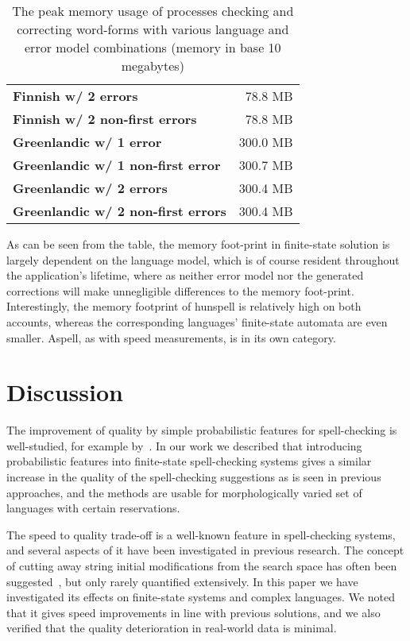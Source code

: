 \documentclass[a4paper,12pt]{article}
\begin{document}
\begin{table}
\begin{tabular}{|l|r|}
        \bf Finnish w/ 2 errors   &  78.8 MB \\
\bf Finnish w/ 2 non-first errors &  78.8 MB \\
        \hline
        \bf Greenlandic w/ 1 error    & 300.0 MB \\
\bf Greenlandic w/ 1 non-first error  & 300.7 MB \\
       \bf Greenlandic w/ 2 errors    & 300.4 MB \\
\bf Greenlandic w/ 2 non-first errors & 300.4 MB \\
        \hline
    \end{tabular}
    \caption{The peak memory usage of processes checking and correcting
        word-forms with various language and error model combinations
        (memory in base 10 megabytes) \label{table:memory}}
\end{table}

As can be seen from the table, the memory foot-print in finite-state
solution is largely dependent on the language model, which is of course
resident throughout the application's lifetime, where as neither error model
nor the generated corrections will make unnegligible differences to the memory
foot-print. Interestingly, the memory footprint of hunspell is relatively
high on both accounts, whereas the corresponding languages' finite-state
automata are even smaller. Aspell, as with speed measurements, is in its own
category.

\section{Discussion}
\label{sec:discussion}

The improvement of quality by simple probabilistic features for spell-checking
is well-studied, for example by~\cite{church1991probability}. In our work we
described that introducing probabilistic features into finite-state spell-checking
systems gives a similar increase in the quality of the spell-checking
suggestions as is seen in previous approaches, and the methods are usable for
morphologically varied set of languages with certain reservations.

The speed to quality trade-off is a well-known feature in spell-checking
systems, and several aspects of it have been investigated in previous research.
The concept of cutting away string initial modifications from the search space
has often been suggested~\cite[]{kukich1992techniques,bhagat2007spelling}, but
only rarely quantified extensively. In this paper we have investigated its
effects on finite-state systems and complex languages. We noted that it gives
speed improvements in line with previous solutions, and we
also verified that the quality deterioration in real-world data is minimal.
\end{document}
